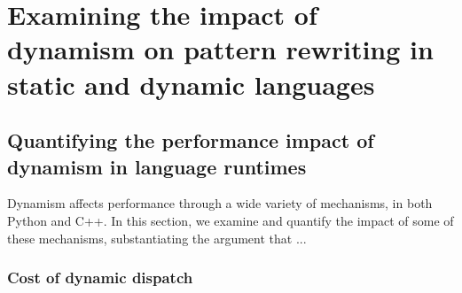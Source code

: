 

\chapter{Examining the impact of dynamism on pattern rewriting in static and dynamic languages}
\label{chap:dynamism-pattern-rewriting}









\section{Quantifying the performance impact of dynamism in language runtimes}

Dynamism affects performance through a wide variety of mechanisms, in both Python and C++.
In this section, we examine and quantify the impact of some of these mechanisms, substantiating the argument that ...

\subsection{Cost of dynamic dispatch}




